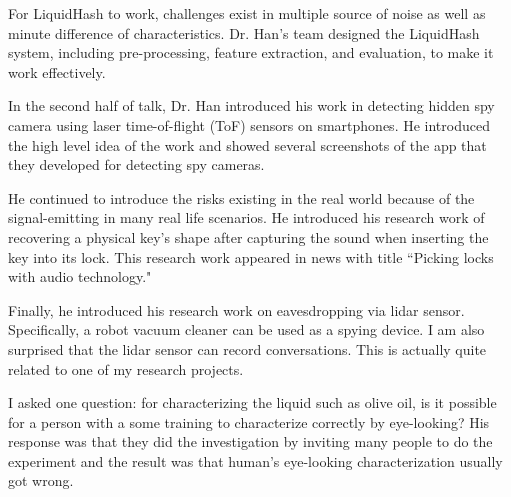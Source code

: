 \documentclass[11pt, oneside]{article}   	%
\begin{document}
For LiquidHash to work,  challenges exist in multiple source of noise as well as minute difference of characteristics. Dr. Han's team designed the LiquidHash system, including pre-processing, feature extraction, and evaluation, to make it work effectively.

In the second half of talk, Dr. Han introduced his work in detecting hidden spy camera using laser time-of-flight (ToF) sensors on smartphones. He introduced the high level idea of the work and showed several screenshots of the app that they developed for detecting spy cameras. 

He continued to introduce the risks existing in the real world because of the signal-emitting in many real life scenarios. He introduced his research work of recovering a physical key's shape after capturing the sound when inserting the key into its lock. This research work appeared in news with title ``Picking locks with audio technology."

Finally, he introduced his research work on eavesdropping via lidar sensor. Specifically, a robot vacuum cleaner can be used as a spying device. I am also surprised that the lidar sensor can record conversations. This is actually quite related to one of my research projects.

I asked one question: for characterizing the liquid such as olive oil, is it possible for a person with a some training to characterize correctly by eye-looking? His response was that they did the investigation by inviting many people to do the experiment and the result was that human's eye-looking characterization usually got wrong.
\end{document}
